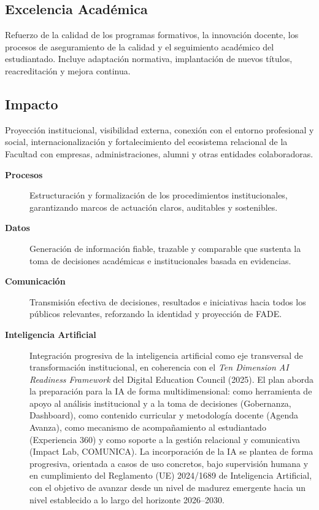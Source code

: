 \documentclass[11pt,a4paper]{scrreprt}
\begin{document}
\subsection*{Excelencia Académica}
\small Refuerzo de la calidad de los programas formativos, la innovación docente, los procesos de aseguramiento de la calidad y el seguimiento académico del estudiantado. Incluye adaptación normativa, implantación de nuevos títulos, reacreditación y mejora continua.

\subsection*{Impacto}
\small Proyección institucional, visibilidad externa, conexión con el entorno profesional y social, internacionalización y fortalecimiento del ecosistema relacional de la Facultad con empresas, administraciones, alumni y otras entidades colaboradoras.

\begin{description}
\item[\textbf{Procesos}]
\small Estructuración y formalización de los procedimientos institucionales, garantizando marcos de actuación claros, auditables y sostenibles.
\item[\textbf{Datos}]
\small Generación de información fiable, trazable y comparable que sustenta la toma de decisiones académicas e institucionales basada en evidencias.
\item[\textbf{Comunicación}]
\small Transmisión efectiva de decisiones, resultados e iniciativas hacia todos los públicos relevantes, reforzando la identidad y proyección de FADE.

\item[\textbf{Inteligencia Artificial}]
\small Integración progresiva de la inteligencia artificial como eje transversal de transformación institucional, en coherencia con el \textit{Ten Dimension AI Readiness Framework} del Digital Education Council (2025). El plan aborda la preparación para la IA de forma multidimensional: como herramienta de apoyo al análisis institucional y a la toma de decisiones (Gobernanza, Dashboard), como contenido curricular y metodología docente (Agenda Avanza), como mecanismo de acompañamiento al estudiantado (Experiencia 360) y como soporte a la gestión relacional y comunicativa (Impact Lab, COMUNICA). La incorporación de la IA se plantea de forma progresiva, orientada a casos de uso concretos, bajo supervisión humana y en cumplimiento del Reglamento (UE) 2024/1689 de Inteligencia Artificial, con el objetivo de avanzar desde un nivel de madurez emergente hacia un nivel establecido a lo largo del horizonte 2026--2030.



\end{description}
\end{document}
